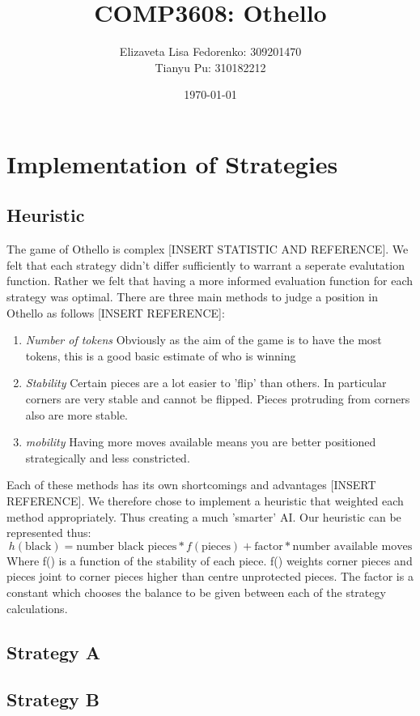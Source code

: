 \documentclass[12pt]{article}
\title{COMP3608: Othello}
\author{Elizaveta Lisa Fedorenko: 309201470
\\ Tianyu Pu: 310182212}
\date{\today}
\begin{document}
\maketitle

\section{Implementation of Strategies}
\subsection{Heuristic}
The game of Othello is complex [INSERT STATISTIC AND REFERENCE]. We felt that each strategy didn't differ sufficiently to warrant a seperate evalutation function. Rather we felt that having a more informed evaluation function for each strategy was optimal. There are three main methods to judge a position in Othello as follows [INSERT REFERENCE]:
\begin{enumerate}
\item \emph{Number of tokens} Obviously as the aim of the game is to have the most tokens, this is a good basic estimate of who is winning
\item \emph{Stability} Certain pieces are a lot easier to 'flip' than others. In particular corners are very stable and cannot be flipped. Pieces protruding from corners also are more stable.
\item \emph{mobility} Having more moves available means you are better positioned strategically and less constricted.
\end{enumerate}
Each of these methods has its own shortcomings and advantages [INSERT REFERENCE]. We therefore chose to implement a heuristic that weighted each method appropriately. Thus creating a much 'smarter' AI.
Our heuristic can be represented thus:
\begin{equation}
h(\mbox{black}) = \mbox{number black pieces}*f(\mbox{pieces}) + \mbox{factor}*\mbox{number available moves}
\end{equation}
Where f() is a function of the stability of each piece. f() weights corner pieces and pieces joint to corner pieces higher than centre unprotected pieces. The factor is a constant which chooses the balance to be given between each of the strategy calculations.
\subsection{Strategy A}
\subsection{Strategy B}
\end{document}
